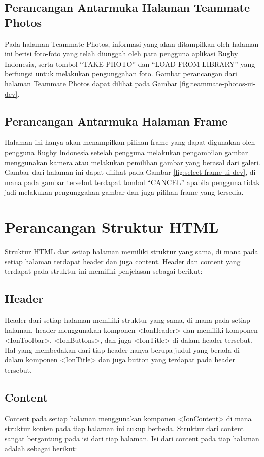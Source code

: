 \subsection{Perancangan Antarmuka Halaman Teammate Photos}

Pada halaman Teammate Photos, informasi yang akan ditampilkan oleh halaman ini berisi foto-foto yang telah diunggah oleh para pengguna aplikasi Rugby Indonesia, serta tombol ``TAKE PHOTO'' dan ``LOAD FROM LIBRARY'' yang berfungsi untuk melakukan pengunggahan foto. Gambar perancangan dari halaman Teammate Photos dapat dilihat pada Gambar \ref{fig:teammate-photos-ui-dev}.

\subsection{Perancangan Antarmuka Halaman Frame}

Halaman ini hanya akan menampilkan pilihan frame yang dapat digunakan oleh pengguna Rugby Indonesia setelah pengguna melakukan pengambilan gambar menggunakan kamera atau melakukan pemilihan gambar yang berasal dari galeri. Gambar dari halaman ini dapat dilihat pada Gambar \ref{fig:select-frame-ui-dev}, di mana pada gambar tersebut terdapat tombol ``CANCEL'' apabila pengguna tidak jadi melakukan pengunggahan gambar dan juga pilihan frame yang tersedia.

\section{Perancangan Struktur HTML}
Struktur HTML dari setiap halaman memiliki struktur yang sama, di mana pada setiap halaman terdapat header dan juga content. Header dan content yang terdapat pada struktur ini memiliki penjelasan sebagai berikut:

\subsection{Header}
Header dari setiap halaman memiliki struktur yang sama, di mana pada setiap halaman, header menggunakan komponen <IonHeader> dan memiliki komponen <IonToolbar>, <IonButtons>, dan juga <IonTitle> di dalam header tersebut. Hal yang membedakan dari tiap header hanya berupa judul yang berada di dalam komponen <IonTitle> dan juga button yang terdapat pada header tersebut.

\subsection{Content}
Content pada setiap halaman menggunakan komponen <IonContent> di mana struktur konten pada tiap halaman ini cukup berbeda. Struktur dari content sangat bergantung pada isi dari tiap halaman. Isi dari content pada tiap halaman adalah sebagai berikut:


